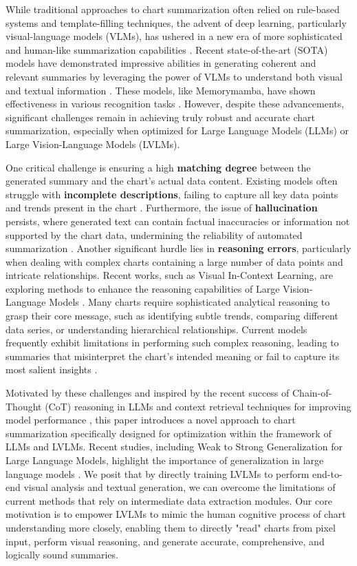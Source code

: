 While traditional approaches to chart summarization often relied on rule-based systems and template-filling techniques, the advent of deep learning, particularly visual-language models (VLMs), has ushered in a new era of more sophisticated and human-like summarization capabilities \cite{SurveyTextSum2021}. Recent state-of-the-art (SOTA) models have demonstrated impressive abilities in generating coherent and relevant summaries by leveraging the power of VLMs to understand both visual and textual information \cite{ChartAssistant2024}.  These models, like Memorymamba, have shown effectiveness in various recognition tasks \cite{wang2024memorymamba}. However, despite these advancements, significant challenges remain in achieving truly robust and accurate chart summarization, especially when optimized for Large Language Models (LLMs) or Large Vision-Language Models (LVLMs).

One critical challenge is ensuring a high \textbf{matching degree} between the generated summary and the chart's actual data content. Existing models often struggle with \textbf{incomplete descriptions}, failing to capture all key data points and trends present in the chart \cite{ChartThinker2024}. Furthermore, the issue of \textbf{hallucination} persists, where generated text can contain factual inaccuracies or information not supported by the chart data, undermining the reliability of automated summarization \cite{LVLMChallenge2024}.  Another significant hurdle lies in \textbf{reasoning errors}, particularly when dealing with complex charts containing a large number of data points and intricate relationships.  Recent works, such as Visual In-Context Learning, are exploring methods to enhance the reasoning capabilities of Large Vision-Language Models \cite{zhou2024visual}. Many charts require sophisticated analytical reasoning to grasp their core message, such as identifying subtle trends, comparing different data series, or understanding hierarchical relationships. Current models frequently exhibit limitations in performing such complex reasoning, leading to summaries that misinterpret the chart's intended meaning or fail to capture its most salient insights \cite{LVLMChallenge2024}.

Motivated by these challenges and inspired by the recent success of Chain-of-Thought (CoT) reasoning in LLMs \cite{CoTPrompting2024,CoTIBM2024} and context retrieval techniques for improving model performance \cite{ContextRetrievalTensorOps2024,ContextRetrievalMedium2024}, this paper introduces a novel approach to chart summarization specifically designed for optimization within the framework of LLMs and LVLMs.  Recent studies, including Weak to Strong Generalization for Large Language Models, highlight the importance of generalization in large language models \cite{zhou2025weak}. We posit that by directly training LVLMs to perform end-to-end visual analysis and textual generation, we can overcome the limitations of current methods that rely on intermediate data extraction modules. Our core motivation is to empower LVLMs to mimic the human cognitive process of chart understanding more closely, enabling them to directly "read" charts from pixel input, perform visual reasoning, and generate accurate, comprehensive, and logically sound summaries.

